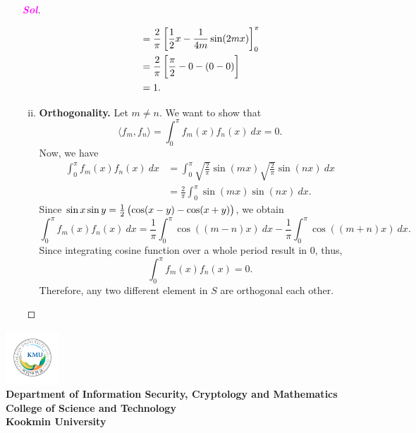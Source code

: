 \documentclass[10pt]{article}
\newcommand{\footer}[1]{
\begin{flushright}
\vspace{2em}
\includegraphics[width=2cm]{school_logo.jpg} \\
\vspace{1em}
\textcolor{blue2}{\small\textbf{#1}}
\end{flushright}
}
\theoremstyle{definition}
\newcommand{\sol}{\textcolor{magenta}{\bf Sol}}
\newcommand{\inner}[1]{\langle #1\rangle}
\begin{document}
\begin{enumerate}[\bf 1.]
\begin{proof}[\sol]
\begin{enumerate}[(i)]
\begin{align*}
		&=\frac{2}{\pi}\sbr{\frac{1}{2}x-\frac{1}{4m}\sin(2mx)}_0^\pi\\
		&=\frac{2}{\pi}\sbr{\frac{\pi}{2}-0-(0-0)}\\
		&=1.
	\end{align*}
	\item \textbf{Orthogonality.} Let \(m\neq n\). We want to show that \[
	\inner{f_m,f_n}=\int_0^\pi f_m(x)f_n(x)\ dx = 0.
	\] Now, we have \begin{align*}
		\int_0^\pi f_m(x)f_n(x)\ dx&=\int_0^\pi\sqrt{\frac{2}{\pi}}\sin(mx)\sqrt{\frac{2}{\pi}}\sin(nx)\ dx\\
		&=\frac{2}{\pi}\int_0^\pi\sin(mx)\sin(nx)\ dx.
	\end{align*} Since $\sin x\sin y=\frac{1}{2}\del{\cos(x-y)-\cos(x+y)}$, we obtain \[
	\int_0^\pi f_m(x)f_n(x)\ dx=\frac{1}{\pi}\int_0^\pi\cos((m-n)x)\ dx-\frac{1}{\pi}\int_0^\pi\cos((m+n)x)\ dx.
	\] Since integrating cosine function over a whole period result in \(0\), thus, \[
	\int_0^\pi f_m(x)f_n(x)=0.
	\] Therefore, any two different element in \(S\) are orthogonal each other.
\end{enumerate}
\end{proof}
\end{enumerate}




\footer{Department of Information Security, Cryptology and Mathematics
\\ College of Science and Technology
\\ Kookmin University}
\end{document}

